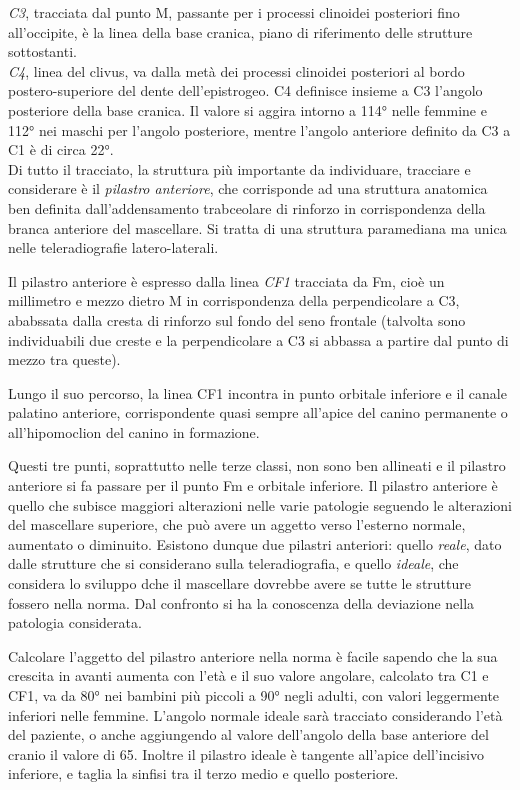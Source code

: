 \emph{C3}, tracciata dal punto M, passante per i processi clinoidei posteriori fino all'occipite, è la linea della base cranica, piano di riferimento delle strutture sottostanti.\\

\emph{C4}, linea del clivus, va dalla metà dei processi clinoidei posteriori al bordo postero-superiore del dente dell'epistrogeo. C4 definisce insieme a C3 l'angolo posteriore della base cranica. Il valore si aggira intorno a 114° nelle femmine e 112° nei maschi per l'angolo posteriore, mentre l'angolo anteriore definito da C3 a C1 è di circa 22°.\\

Di tutto il tracciato, la struttura più importante da individuare, tracciare e considerare è il \emph{pilastro anteriore}, che corrisponde ad una struttura anatomica ben definita dall'addensamento trabceolare di rinforzo in corrispondenza della branca anteriore del mascellare. Si tratta di una struttura paramediana ma unica nelle teleradiografie latero-laterali.

Il pilastro anteriore è espresso dalla linea \emph{CF1} tracciata da Fm, cioè un millimetro e mezzo dietro M in corrispondenza della perpendicolare a C3, ababssata dalla cresta di rinforzo sul fondo del seno frontale (talvolta sono individuabili due creste e la perpendicolare a C3 si abbassa a partire dal punto di mezzo tra queste).

Lungo il suo percorso, la linea CF1 incontra in punto orbitale inferiore e il canale palatino anteriore, corrispondente quasi sempre all'apice del canino permanente o all'hipomoclion del canino in formazione.

Questi tre punti, soprattutto nelle terze classi, non sono ben allineati e il pilastro anteriore si fa passare per il punto Fm e orbitale inferiore. Il pilastro anteriore è quello che subisce maggiori alterazioni nelle varie patologie seguendo le alterazioni del mascellare superiore, che può avere un aggetto verso l'esterno normale, aumentato o diminuito. Esistono dunque due pilastri anteriori: quello \emph{reale}, dato dalle strutture che si considerano sulla teleradiografia, e quello \emph{ideale}, che considera lo sviluppo dche il mascellare dovrebbe avere se tutte le strutture fossero nella norma. Dal confronto si ha la conoscenza della deviazione nella patologia considerata.

Calcolare l'aggetto del pilastro anteriore nella norma è facile sapendo che la sua crescita in avanti aumenta con l'età e il suo valore angolare, calcolato tra C1 e CF1, va da 80° nei bambini più piccoli a 90° negli adulti, con valori leggermente inferiori nelle femmine. L'angolo normale ideale sarà tracciato considerando l'età del paziente, o anche aggiungendo al valore dell'angolo della base anteriore del cranio il valore di 65. Inoltre il pilastro ideale è tangente all'apice dell'incisivo inferiore, e taglia la sinfisi tra il terzo medio e quello posteriore.\\

